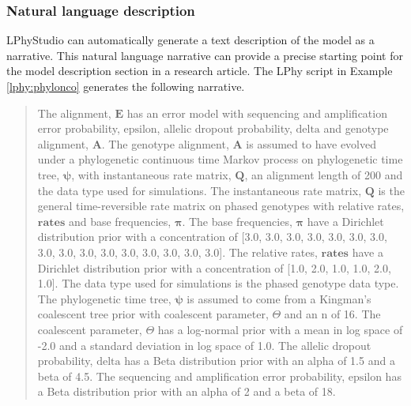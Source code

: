 \documentclass[10pt,letterpaper,table]{article}
\theoremstyle{definition}
\begin{document}
\subsubsection*{Natural language description}
\noindent LPhyStudio can automatically generate a text description of the model as a narrative. 
This natural language narrative can provide a precise starting point for the model description section in a research article.
The LPhy script in Example \ref{lphy:phylonco} generates the following narrative. 

\begin{quote} 
The alignment, $\boldsymbol{E}$ has an error model \cite{kozlov2022cellphy} with  sequencing and amplification error probability, $\textrm{epsilon}$,  allelic dropout probability, $\textrm{delta}$ and  genotype alignment, $\boldsymbol{A}$.
The genotype alignment, $\boldsymbol{A}$ is assumed to have evolved under a phylogenetic continuous time Markov process \cite{felsenstein1981} on  phylogenetic time tree, $\boldsymbol{\psi}$, with  instantaneous rate matrix, $\boldsymbol{Q}$, an alignment length of 200 and the data type used for simulations.
The instantaneous rate matrix, $\boldsymbol{Q}$ is the general time-reversible rate matrix on phased genotypes \cite{kozlov2022cellphy} with relative rates, $\boldsymbol{\textbf{rates}}$ and base frequencies, $\boldsymbol{\pi}$.
The base frequencies, $\boldsymbol{\pi}$ have a Dirichlet distribution prior with a concentration of [3.0, 3.0, 3.0, 3.0, 3.0, 3.0, 3.0, 3.0, 3.0, 3.0, 3.0, 3.0, 3.0, 3.0, 3.0, 3.0].
The relative rates, $\boldsymbol{\textbf{rates}}$ have a Dirichlet distribution prior with a concentration of [1.0, 2.0, 1.0, 1.0, 2.0, 1.0].
The data type used for simulations is the phased genotype data type.
The phylogenetic time tree, $\boldsymbol{\psi}$ is assumed to come from a Kingman's coalescent tree prior \cite{Rodrigo1999SerialCoalescent} with  coalescent parameter, $\Theta$ and an n of 16.
The coalescent parameter, $\Theta$ has a log-normal prior with a mean in log space of -2.0 and a standard deviation in log space of 1.0.
The allelic dropout probability, $\textrm{delta}$ has a Beta distribution prior with an alpha of 1.5 and a beta of 4.5.
The sequencing and amplification error probability, $\textrm{epsilon}$ has a Beta distribution prior with an alpha of 2 and a beta of 18.
\end{quote}
\end{document}
